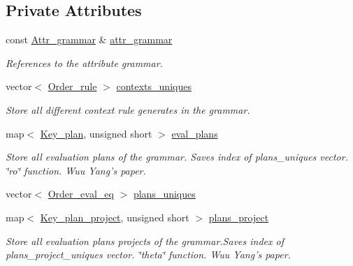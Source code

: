 \subsection*{Private Attributes}
\begin{DoxyCompactItemize}
\item 
const \hyperlink{classgenevalmag_1_1Attr__grammar}{Attr\_\-grammar} \& \hyperlink{classgenevalmag_1_1Builder__plans_a247759aafc18133de19c8c95afb9c2d5}{attr\_\-grammar}
\begin{DoxyCompactList}\small\item\em References to the attribute grammar. \item\end{DoxyCompactList}\item 
vector$<$ \hyperlink{namespacegenevalmag_aed20da32fb9692645ae53d911d274fd5}{Order\_\-rule} $>$ \hyperlink{classgenevalmag_1_1Builder__plans_aac38711883bb0acd21483d2a918e0f0d}{contexts\_\-uniques}
\begin{DoxyCompactList}\small\item\em Store all different context rule generates in the grammar. \item\end{DoxyCompactList}\item 
map$<$ \hyperlink{structgenevalmag_1_1k__plan}{Key\_\-plan}, unsigned short $>$ \hyperlink{classgenevalmag_1_1Builder__plans_a02c97bab7b3561f4dde009b974255dfe}{eval\_\-plans}
\begin{DoxyCompactList}\small\item\em Store all evaluation plans of the grammar. Saves index of plans\_\-uniques vector. \char`\"{}ro\char`\"{} function. Wuu Yang's paper. \item\end{DoxyCompactList}\item 
vector$<$ \hyperlink{namespacegenevalmag_a0bb2e8b0fa1b07b873f0363719de7b64}{Order\_\-eval\_\-eq} $>$ \hyperlink{classgenevalmag_1_1Builder__plans_a9cb3fc77b164a22cf37a0ec3e8f78bf7}{plans\_\-uniques}
\item 
map$<$ \hyperlink{structgenevalmag_1_1k__p__project}{Key\_\-plan\_\-project}, unsigned short $>$ \hyperlink{classgenevalmag_1_1Builder__plans_ab353b4b6e3b9c72a8fb61ee376a4f76c}{plans\_\-project}
\begin{DoxyCompactList}\small\item\em Store all evaluation plans projects of the grammar.Saves index of plans\_\-project\_\-uniques vector. \char`\"{}theta\char`\"{} function. Wuu Yang's paper. \item\end{DoxyCompactList}\item 

\end{DoxyCompactItemize}
